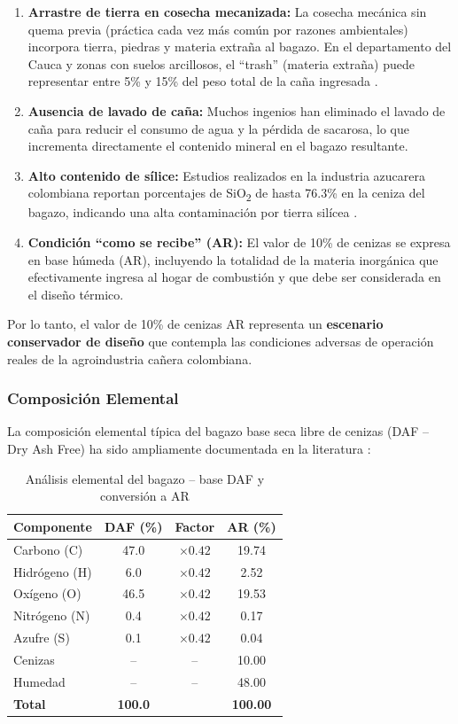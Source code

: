 \begin{enumerate}
	\item \textbf{Arrastre de tierra en cosecha mecanizada:} La cosecha mecánica sin quema previa (práctica cada vez más común por razones ambientales) incorpora tierra, piedras y materia extraña al bagazo. En el departamento del Cauca y zonas con suelos arcillosos, el ``trash'' (materia extraña) puede representar entre 5\% y 15\% del peso total de la caña ingresada \cite{cenicana2023}.
	\item \textbf{Ausencia de lavado de caña:} Muchos ingenios han eliminado el lavado de caña para reducir el consumo de agua y la pérdida de sacarosa, lo que incrementa directamente el contenido mineral en el bagazo resultante.
	\item \textbf{Alto contenido de sílice:} Estudios realizados en la industria azucarera colombiana reportan porcentajes de SiO\textsubscript{2} de hasta 76.3\% en la ceniza del bagazo, indicando una alta contaminación por tierra silícea \cite{scielo_ceniza}.
	\item \textbf{Condición ``como se recibe'' (AR):} El valor de 10\% de cenizas se expresa en base húmeda (AR), incluyendo la totalidad de la materia inorgánica que efectivamente ingresa al hogar de combustión y que debe ser considerada en el diseño térmico.
\end{enumerate}

Por lo tanto, el valor de 10\% de cenizas AR representa un \textbf{escenario conservador de diseño} que contempla las condiciones adversas de operación reales de la agroindustria cañera colombiana.

\subsubsection{Composición Elemental}
La composición elemental típica del bagazo base seca libre de cenizas (DAF -- Dry Ash Free) ha sido ampliamente documentada en la literatura \cite{hugot1986, scielo_bagasse}:

\begin{table}[H]
	\centering
	\caption{Análisis elemental del bagazo -- base DAF y conversión a AR}
	\label{tab:ultimate_analysis}
	\begin{tabular}{@{}lccc@{}}
		\toprule
		\textbf{Componente} & \textbf{DAF (\%)} & \textbf{Factor} & \textbf{AR (\%)} \\
		\midrule
		Carbono (C) & 47.0 & $\times 0.42$ & 19.74 \\
		Hidrógeno (H) & 6.0 & $\times 0.42$ & 2.52 \\
		Oxígeno (O) & 46.5 & $\times 0.42$ & 19.53 \\
		Nitrógeno (N) & 0.4 & $\times 0.42$ & 0.17 \\
		Azufre (S) & 0.1 & $\times 0.42$ & 0.04 \\
		\midrule
		Cenizas & -- & -- & 10.00 \\
		Humedad & -- & -- & 48.00 \\
		\midrule
		\textbf{Total} & \textbf{100.0} & & \textbf{100.00} \\
		\bottomrule
	\end{tabular}
\end{table}

